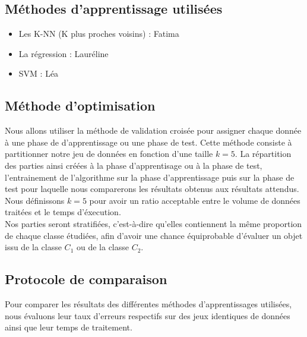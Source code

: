 \documentclass[a4paper,10pt]{article}
\begin{document}
	\subsection{Méthodes d'apprentissage utilisées}
		\begin{itemize}
			\item Les K-NN (K plus proches voisins) : Fatima
			\item La régression : Lauréline
			\item SVM : Léa
		\end{itemize}

	\subsection{Méthode d'optimisation}
		Nous allons utiliser la méthode de validation croisée pour assigner chaque donnée à une phase de d'apprentissage ou une phase de test. Cette méthode consiste à partitionner notre jeu de données en fonction d'une taille $k=5$. La répartition des parties ainsi créées à la phase d'apprentisage ou à la phase de test, l'entrainement de l'algorithme sur la phase d'apprentissage puis sur la phase de test pour laquelle nous comparerons les résultats obtenus aux résultats attendus. \\
		Nous définissons $k=5$ pour avoir un ratio acceptable entre le volume de données traitées et le temps d'éxecution.\\
		Nos parties seront stratifiées, c'est-à-dire qu'elles contiennent la même proportion de chaque classe étudiées, afin d'avoir une chance équiprobable d'évaluer un objet issu de la classe $C_1$ ou de la classe $C_2$.

	\subsection{Protocole de comparaison}
		Pour comparer les résultats des différentes méthodes d'apprentissages utilisées, nous évaluons leur taux d’erreurs respectifs sur des jeux identiques de données ainsi que leur temps de traitement.
\end{document}
